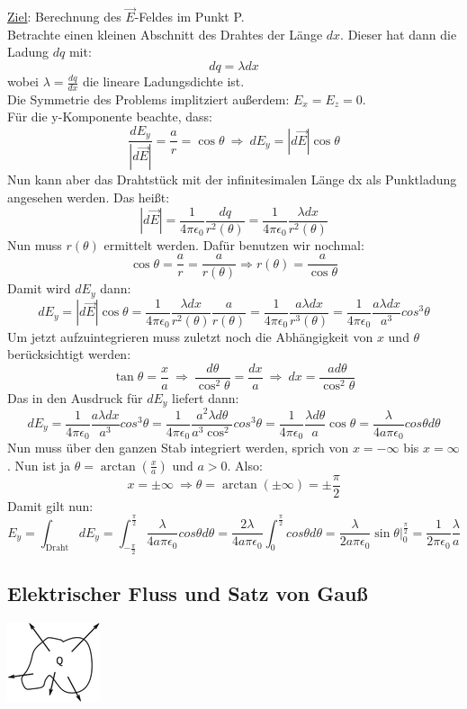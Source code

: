\documentclass[11pt]{article}
\begin{document}
		\underline{Ziel}: Berechnung des $\vec E$-Feldes im Punkt P.\\
Betrachte einen kleinen Abschnitt des Drahtes der Länge $dx$. Dieser hat dann die Ladung $dq$ mit:
$$dq=\lambda dx$$
wobei $\lambda=\frac{dq}{dx}$ die lineare Ladungsdichte ist.\\
Die Symmetrie des Problems implitziert au\ss{}erdem: $E_x=E_z=0$.\\
Für die y-Komponente beachte, dass:
$$\frac{dE_y}{|d\vec E|}=\frac{a}{r}=\cos\theta\ \Rightarrow\ dE_y=|d\vec E|\cos\theta$$
Nun kann aber das Drahtstück mit der infinitesimalen Länge dx als Punktladung angesehen werden. Das hei\ss{}t:
$$|d\vec E|=\frac{1}{4\pi\epsilon_0}\frac{dq}{r^2(\theta)}=\frac{1}{4\pi\epsilon_0}\frac{\lambda dx}{r^2(\theta)}$$
Nun muss $r(\theta)$ ermittelt werden. Dafür benutzen wir nochmal:
$$\cos\theta=\frac{a}{r}=\frac{a}{r(\theta)}\Rightarrow r(\theta)=\frac{a}{\cos\theta}$$
Damit wird $dE_y$ dann:
$$dE_y=|d\vec E|\cos\theta=\frac{1}{4\pi\epsilon_0}\frac{\lambda dx}{r^2(\theta)}\frac{a}{r(\theta)}=
\frac{1}{4\pi\epsilon_0}\frac{a\lambda dx}{r^3(\theta)}=\frac{1}{4\pi\epsilon_0}\frac{a\lambda dx}{a^3}cos^3\theta$$
Um jetzt aufzuintegrieren muss zuletzt noch die Abhängigkeit von $x$ und $\theta$ berücksichtigt werden:
$$\tan\theta=\frac{x}{a}\ \Rightarrow\ \frac{d\theta}{\cos^2\theta}=\frac{dx}{a}\ \Rightarrow\ dx=\frac{ad\theta}{\cos^2\theta}$$
Das in den Ausdruck für $dE_y$ liefert dann:
$$dE_y=\frac{1}{4\pi\epsilon_0}\frac{a\lambda dx}{a^3}cos^3\theta=\frac{1}{4\pi\epsilon_0}\frac{a^2\lambda d\theta}{a^3\cos^2}cos^3\theta=\frac{1}{4\pi\epsilon_0}\frac{\lambda d\theta}{a}\cos\theta=\frac{\lambda}{4a\pi\epsilon_0}cos\theta d\theta$$
Nun muss über den ganzen Stab integriert werden, sprich von $x=-\infty$ bis $x=\infty$. 
Nun ist ja $\theta=\arctan\left(\frac{x}{a}\right)$ und $a>0$. Also:
$$x=\pm\infty\ \Rightarrow \theta=\arctan(\pm\infty)=\pm\frac{\pi}{2}$$
Damit gilt nun:
$$E_y=\int_{\text{Draht}}dE_y=\int_{-\frac{\pi}{2}}^{\frac{\pi}{2}}\frac{\lambda}{4a\pi\epsilon_0}cos\theta d\theta=\frac{2\lambda}{4a\pi\epsilon_0}\int_{0}^{\frac{\pi}{2}}cos\theta d\theta=\frac{\lambda}{2a\pi\epsilon_0}\sin\theta\bigg|_0^\frac{\pi}{2}=\frac{1}{2\pi\epsilon_0}\frac{\lambda}{a}$$

		
	
\subsection{Elektrischer Fluss und Satz von Gau\ss{}}

\includegraphics{skizzen/14/14_6B0}
		
\end{document}

